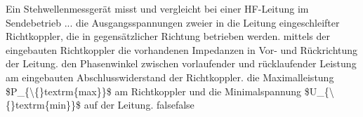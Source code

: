     {Ein Stehwellenmessgerät misst und vergleicht bei einer HF-Leitung im Sendebetrieb ...}
    {die Ausgangsspannungen zweier in die Leitung eingeschleifter Richtkoppler, die in gegensätzlicher Richtung betrieben werden.  }
    {mittels der eingebauten Richtkoppler die vorhandenen Impedanzen in Vor- und Rückrichtung der Leitung.}
    {den Phasenwinkel zwischen vorlaufender und rücklaufender Leistung am eingebauten Abschlusswiderstand der Richtkoppler.}
    {die Maximalleistung \$P\_\{\textbackslash\{\}textrm\{max\}\}\$ am Richtkoppler und die Minimalspannung \$U\_\{\textbackslash\{\}textrm\{min\}\}\$ auf der Leitung.}
    {false}{false}